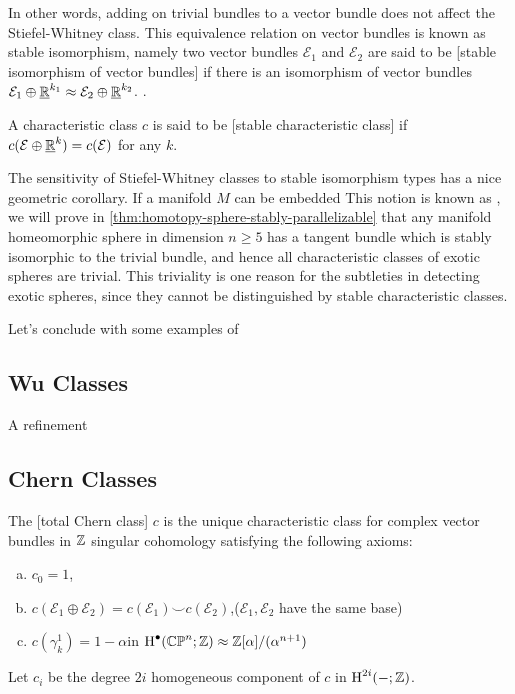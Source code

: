 In other words, adding on trivial bundles to a vector bundle does not affect the Stiefel-Whitney class. This equivalence relation on vector bundles is known as stable isomorphism, namely two vector bundles $\mathcal{E}_1$ and $\mathcal{E}_2$ are said to be [stable isomorphism of vector bundles] if there is an isomorphism of vector bundles $\mathcal{E}_1\oplus \underline{\mathbb{R}}^{k_1} \approx \mathcal{E}_2\oplus \underline{\mathbb{R}}^{k_2}$. .

\begin{definition}
	A characteristic class $c$ is said to be [stable characteristic class] if $c(\mathcal{E}\oplus \underline{\mathbb{R}}^k) = c(\mathcal{E})$ for any $k$.
\end{definition}

The sensitivity of Stiefel-Whitney classes to stable isomorphism types has a nice geometric corollary. If a manifold $M$ can be embedded 
This notion is known as ,
we will prove in \cref{thm:homotopy-sphere-stably-parallelizable} that any manifold homeomorphic sphere in dimension $n\geq 5$ has a tangent bundle which is stably isomorphic to the trivial bundle, and hence all characteristic classes of exotic spheres are trivial. This triviality is one reason for the subtleties in detecting exotic spheres, since they cannot be distinguished by stable characteristic classes.

Let's conclude with some examples of 
\begin{theorem}

\end{theorem}

\subsection{Wu Classes}

A refinement

\subsection{Chern Classes}

\begin{definition}
	The [total Chern class] $c$ is the unique characteristic class for complex vector bundles in $\mathbb{Z}$ singular cohomology satisfying the following axioms:
	\begin{enumerate}[(a)]
		\item $c_0=1$,
		\item $c(\mathcal{E}_1\oplus \mathcal{E}_2)=c(\mathcal{E}_1)\smile c(\mathcal{E}_2)$,\hfill ($\mathcal{E}_1, \mathcal{E}_2$ have the same base)
		\item $c(\gamma^1_k)=1-\alpha$\hfill in $\operatorname{H}^\bullet(\mathbb{CP}^n;\mathbb{Z})\approx \mathbb{Z}[\alpha]/(\alpha^{n+1})$
	\end{enumerate}
	Let $c_i$ be the degree $2i$ homogeneous component of $c$ in $\operatorname{H}^{2i}(-;\mathbb{Z})$.
\end{definition}

